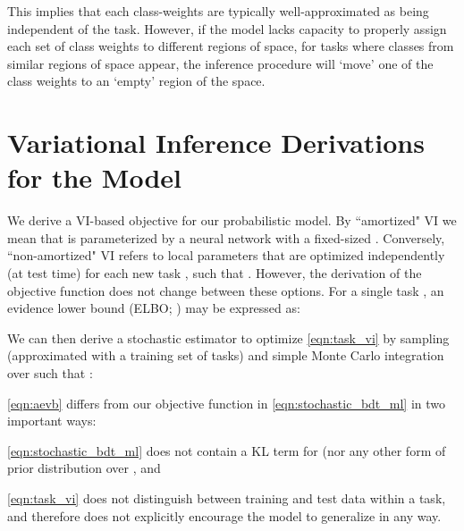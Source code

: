 \documentclass{article}
\begin{document}
This implies that each class-weights are typically well-approximated as being independent of the task. However, if the model lacks capacity to properly assign each set of class weights to different regions of space, for tasks where classes from similar regions of space appear, the inference procedure will `move' one of the class weights to an `empty' region of the space.











\section{Variational Inference Derivations for the Model}
\label{app:vi_derivation}
\setcounter{figure}{0}   
\setcounter{table}{0}
\setcounter{equation}{0}

We derive a VI-based objective for our probabilistic model. By ``amortized" VI we mean that  is parameterized by a neural network with a fixed-sized . Conversely, ``non-amortized" VI refers to local parameters  that are optimized independently (at test time) for each new task , such that . However, the derivation of the objective function does not change between these options. For a single task , an evidence lower bound (ELBO; \citep{wainwright2008graphical}) may be expressed as:

We can then derive a stochastic estimator to optimize \cref{eqn:task_vi} by sampling  (approximated with a training set of tasks) and simple Monte Carlo integration over  such that :

\cref{eqn:aevb} differs from our objective function in \cref{eqn:stochastic_bdt_ml} in two important ways:
\begin{inlinelist}
\item \cref{eqn:stochastic_bdt_ml} does not contain a KL term for  (nor any other form of prior distribution over , and
\item \cref{eqn:task_vi} does not distinguish between training and test data within a task, and therefore does not explicitly encourage the model to generalize in any way.
\end{inlinelist}
\end{document}
